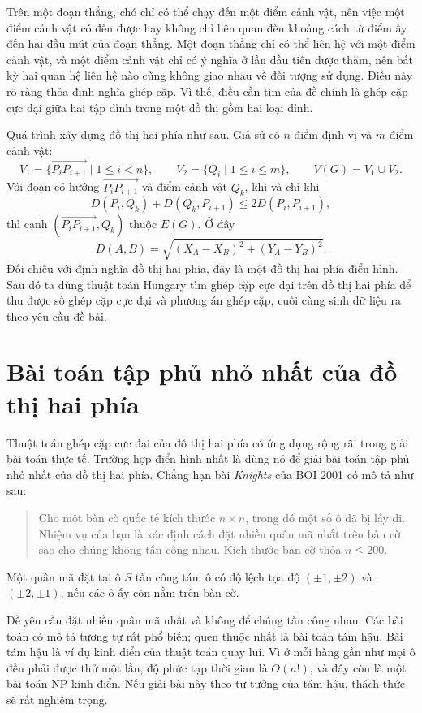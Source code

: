 \documentclass[11pt]{article}
\begin{document}
Trên một đoạn thẳng, chó chỉ có thể chạy đến một điểm cảnh vật, nên việc một
điểm cảnh vật có đến được hay không chỉ liên quan đến khoảng cách từ điểm ấy
đến hai đầu mút của đoạn thẳng. Một đoạn thẳng chỉ có thể liên hệ với một
điểm cảnh vật, và một điểm cảnh vật chỉ có ý nghĩa ở lần đầu tiên được thăm,
nên bất kỳ hai quan hệ liên hệ nào cũng không giao nhau về đối tượng sử dụng.
Điều này rõ ràng thỏa định nghĩa ghép cặp. Vì thế, điều cần tìm của đề chính
là ghép cặp cực đại giữa hai tập đỉnh trong một đồ thị gồm hai loại đỉnh.

Quá trình xây dựng đồ thị hai phía như sau. Giả sử có \(n\) điểm định vị và
\(m\) điểm cảnh vật:
\[
  V_1=\{\overrightarrow{P_iP_{i+1}}\mid 1\le i<n\},\qquad
  V_2=\{Q_i\mid 1\le i\le m\},\qquad
  V(G)=V_1\cup V_2.
\]
Với đoạn có hướng \(\overrightarrow{P_iP_{i+1}}\) và điểm cảnh vật \(Q_k\),
khi và chỉ khi
\[
  D(P_i,Q_k)+D(Q_k,P_{i+1})\le 2D(P_i,P_{i+1}),
\]
thì cạnh \((\overrightarrow{P_iP_{i+1}},Q_k)\) thuộc \(E(G)\). Ở đây
\[
  D(A,B)=\sqrt{(X_A-X_B)^2+(Y_A-Y_B)^2}.
\]
Đối chiếu với định nghĩa đồ thị hai phía, đây là một đồ thị hai phía điển
hình. Sau đó ta dùng thuật toán Hungary tìm ghép cặp cực đại trên đồ thị hai
phía để thu được số ghép cặp cực đại và phương án ghép cặp, cuối cùng sinh
dữ liệu ra theo yêu cầu đề bài.

\section{Bài toán tập phủ nhỏ nhất của đồ thị hai phía}

Thuật toán ghép cặp cực đại của đồ thị hai phía có ứng dụng rộng rãi trong
giải bài toán thực tế. Trường hợp điển hình nhất là dùng nó để giải bài toán
tập phủ nhỏ nhất của đồ thị hai phía. Chẳng hạn bài \textit{Knights} của BOI
2001 có mô tả như sau:

\begin{quote}
Cho một bàn cờ quốc tế kích thước \(n\times n\), trong đó một số ô đã bị lấy
đi. Nhiệm vụ của bạn là xác định cách đặt nhiều quân mã nhất trên bàn cờ sao
cho chúng không tấn công nhau. Kích thước bàn cờ thỏa \(n\le 200\).
\end{quote}

Một quân mã đặt tại ô \(S\) tấn công tám ô có độ lệch tọa độ
\((\pm 1,\pm 2)\) và \((\pm 2,\pm 1)\), nếu các ô ấy còn nằm trên bàn cờ.

Đề yêu cầu đặt nhiều quân mã nhất và không để chúng tấn công nhau. Các bài
toán có mô tả tương tự rất phổ biến; quen thuộc nhất là bài toán tám hậu.
Bài tám hậu là ví dụ kinh điển của thuật toán quay lui. Vì ở mỗi hàng gần
như mọi ô đều phải được thử một lần, độ phức tạp thời gian là \(O(n!)\), và
đây còn là một bài toán NP kinh điển. Nếu giải bài này theo tư tưởng của tám
hậu, thách thức sẽ rất nghiêm trọng.
\end{document}
